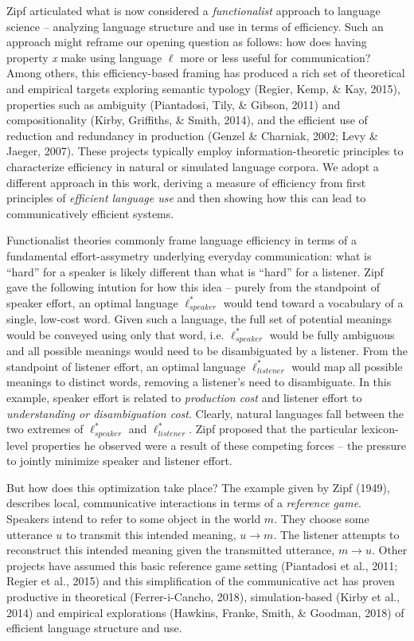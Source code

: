 \documentclass[10pt, letterpaper]{article}
\begin{document}
Zipf articulated what is now considered a \emph{functionalist} approach
to language science -- analyzing language structure and use in terms of
efficiency. Such an approach might reframe our opening question as
follows: how does having property \textit{x} make using language
\(\ell\) more or less useful for communication? Among others, this
efficiency-based framing has produced a rich set of theoretical and
empirical targets exploring semantic typology (Regier, Kemp, \& Kay,
2015), properties such as ambiguity (Piantadosi, Tily, \& Gibson, 2011)
and compositionality (Kirby, Griffiths, \& Smith, 2014), and the
efficient use of reduction and redundancy in production (Genzel \&
Charniak, 2002; Levy \& Jaeger, 2007). These projects typically employ
information-theoretic principles to characterize efficiency in natural
or simulated language corpora. We adopt a different approach in this
work, deriving a measure of efficiency from first principles of
\textit{efficient language use} and then showing how this can lead to
communicatively efficient systems.\par

Functionalist theories commonly frame language efficiency in terms of a
fundamental effort-assymetry underlying everyday communication: what is
``hard'' for a speaker is likely different than what is ``hard'' for a
listener. Zipf gave the following intution for how this idea -- purely
from the standpoint of speaker effort, an optimal language
\(\ell_{speaker}^*\) would tend toward a vocabulary of a single,
low-cost word. Given such a language, the full set of potential meanings
would be conveyed using only that word, i.e. \(\ell_{speaker}^*\) would
be fully ambiguous and all possible meanings would need to be
disambiguated by a listener. From the standpoint of listener effort, an
optimal language \(\ell_{listener}^*\) would map all possible meanings
to distinct words, removing a listener's need to disambiguate. In this
example, speaker effort is related to \emph{production cost} and
listener effort to \emph{understanding or disambiguation cost}. Clearly,
natural languages fall between the two extremes of \(\ell_{speaker}^*\)
and \(\ell_{listener}^*\). Zipf proposed that the particular
lexicon-level properties he observed were a result of these competing
forces -- the pressure to jointly minimize speaker and listener
effort.\par

But how does this optimization take place? The example given by Zipf
(1949), describes local, communicative interactions in terms of a
\textit{reference game}. Speakers intend to refer to some object in the
world \(m\). They choose some utterance \(u\) to transmit this intended
meaning, \(u \rightarrow m\). The listener attempts to reconstruct this
intended meaning given the transmitted utterance, \(m \rightarrow u\).
Other projects have assumed this basic reference game setting
(Piantadosi et al., 2011; Regier et al., 2015) and this simplification
of the communicative act has proven productive in theoretical
(Ferrer-i-Cancho, 2018), simulation-based (Kirby et al., 2014) and
empirical explorations (Hawkins, Franke, Smith, \& Goodman, 2018) of
efficient language structure and use.\par
\end{document}
